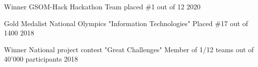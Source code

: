 

\begin{cvhonors}
  \cvhonor
  {Winner} %
  {GSOM-Hack Hackathon} %
  {Team placed \#1 out of 12} %
  {2020} %

  \cvhonor
  {Gold Medalist} %
  {National Olympics "Information Technologies"} %
  {Placed \#17 out of 1400} %
  {2018} %

  \cvhonor
  {Winner} %
  {National project contest "Great Challenges"} %
  {Member of 1/12 teams out of 40'000 participants} %
  {2018} %

\end{cvhonors}
